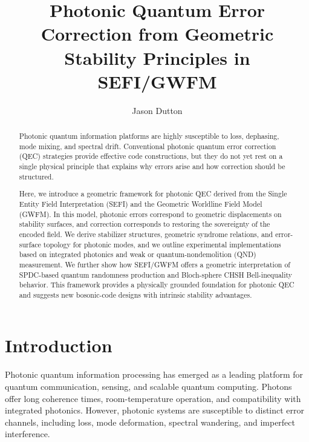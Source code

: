 \documentclass[aip, adv, reprint, superscriptaddress]{revtex4-2}
\begin{document}
\title{Photonic Quantum Error Correction from Geometric Stability Principles in SEFI/GWFM}

\author{Jason Dutton}

\begin{abstract}
Photonic quantum information platforms are highly susceptible to loss, dephasing, mode 
mixing, and spectral drift. Conventional photonic quantum error correction (QEC) 
strategies provide effective code constructions, but they do not yet rest on a single 
physical principle that explains why errors arise and how correction should be structured.

Here, we introduce a geometric framework for photonic QEC derived from the Single 
Entity Field Interpretation (SEFI) and the Geometric Worldline Field Model (GWFM). In 
this model, photonic errors correspond to geometric displacements on stability surfaces, 
and correction corresponds to restoring the sovereignty of the encoded field. We derive 
stabilizer structures, geometric syndrome relations, and error-surface topology for 
photonic modes, and we outline experimental implementations based on integrated 
photonics and weak or quantum-nondemolition (QND) measurement. We further show 
how SEFI/GWFM offers a geometric interpretation of SPDC-based quantum randomness 
production and Bloch-sphere CHSH Bell-inequality behavior. This framework provides a 
physically grounded foundation for photonic QEC and suggests new bosonic-code designs 
with intrinsic stability advantages.
\end{abstract}


\maketitle

\section{Introduction}

Photonic quantum information processing has emerged as a leading platform for quantum 
communication, sensing, and scalable quantum computing. Photons offer long coherence 
times, room-temperature operation, and compatibility with integrated photonics. However, 
photonic systems are susceptible to distinct error channels, including loss, mode 
deformation, spectral wandering, and imperfect interference.
\end{document}
